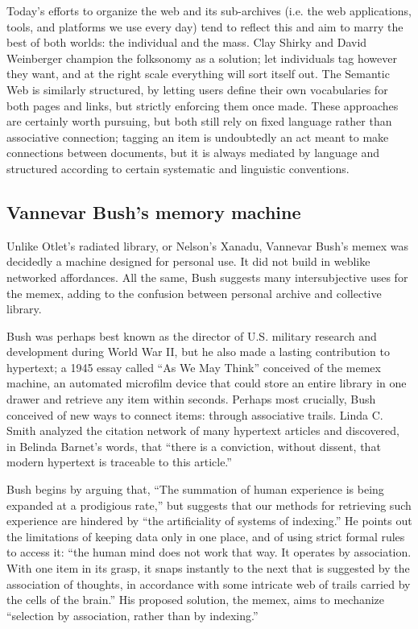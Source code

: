 Today's efforts to organize the web and its sub-archives (i.e. the web applications, tools, and platforms we use every day) tend to reflect this and aim to marry the best of both worlds: the individual and the mass. Clay Shirky and David Weinberger champion the folksonomy as a solution; let individuals tag however they want, and at the right scale everything will sort itself out.\autocite[165-8]{weinberger_everything_2008,shirky_ontology_2005} The Semantic Web is similarly structured, by letting users define their own vocabularies for both pages and links, but strictly enforcing them once made.  These approaches are certainly worth pursuing, but both still rely on fixed language rather than associative connection; tagging an item is undoubtedly an act meant to make connections between documents, but it is always mediated by language and structured according to certain systematic and linguistic conventions.

\subsection{Vannevar Bush's memory machine}

Unlike Otlet's radiated library, or Nelson's Xanadu, Vannevar Bush's memex was decidedly a machine designed for personal use. It did not build in weblike networked affordances. All the same, Bush suggests many intersubjective uses for the memex, adding to the confusion between personal archive and collective library.

Bush was perhaps best known as the director of U.S. military research and development during World War II, but he also made a lasting contribution to hypertext; a 1945 essay called ``As We May Think'' conceived of the memex machine, an automated microfilm device that could store an entire library in one drawer and retrieve any item within seconds.\autocite{bush_as_1945} Perhaps most crucially, Bush conceived of new ways to connect items: through associative trails. Linda C. Smith analyzed the citation network of many hypertext articles and discovered, in Belinda Barnet's words, that ``there is a conviction, without dissent, that modern hypertext is traceable to this article.''\autocite{barnet_technical_2008}

Bush begins by arguing that, ``The summation of human experience is being expanded at a prodigious rate,'' but suggests that our methods for retrieving such experience are hindered by ``the artificiality of systems of indexing.''\autocite{bush_as_1945} He points out the limitations of keeping data only in one place, and of using strict formal rules to access it: ``the human mind does not work that way. It operates by association. With one item in its grasp, it snaps instantly to the next that is suggested by the association of thoughts, in accordance with some intricate web of trails carried by the cells of the brain.'' His proposed solution, the memex, aims to mechanize ``selection by association, rather than by indexing.''\autocite{bush_as_1945}

